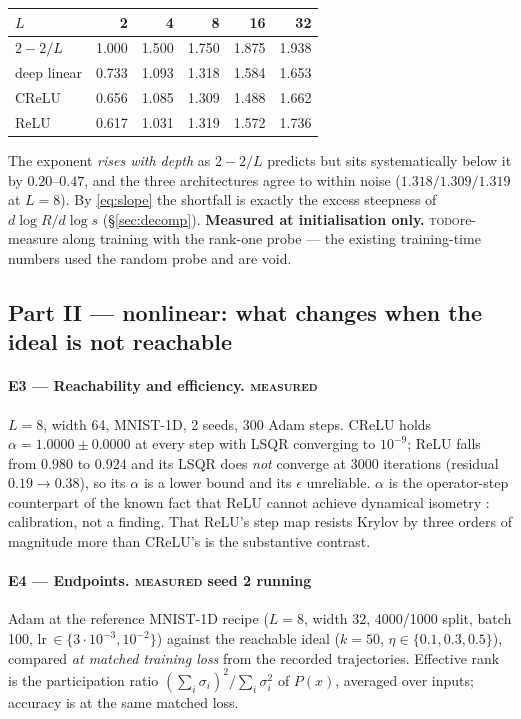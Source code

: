 \documentclass{article}
\newcommand{\RUN}{{\color{blue!70!black}\textsc{measured}}}
\newcommand{\TD}{{\color{orange!85!black}\textsc{todo}}}
\newcommand{\NOTE}[1]{{\color{gray}\small #1}}
\theoremstyle{plain}\newtheorem{theorem}{Theorem}\newtheorem{lemma}[theorem]{Lemma}
\theoremstyle{definition}\newtheorem{definition}[theorem]{Definition}
\begin{document}
\begin{center}\small
\begin{tabular}{lrrrrr}
\toprule
$L$ & 2 & 4 & 8 & 16 & 32 \\
\midrule
$2-2/L$      & 1.000 & 1.500 & 1.750 & 1.875 & 1.938 \\
deep linear  & 0.733 & 1.093 & 1.318 & 1.584 & 1.653 \\
CReLU        & 0.656 & 1.085 & 1.309 & 1.488 & 1.662 \\
ReLU         & 0.617 & 1.031 & 1.319 & 1.572 & 1.736 \\
\bottomrule
\end{tabular}
\end{center}

The exponent \emph{rises with depth} as $2-2/L$ predicts but sits systematically below it by
$0.20$--$0.47$, and the three architectures agree to within noise ($1.318/1.309/1.319$ at $L{=}8$).
By \eqref{eq:slope} the shortfall is exactly the excess steepness of $d\log R/d\log s$
(\S\ref{sec:decomp}). \textbf{Measured at initialisation only.}
\TD{re-measure along training with the rank-one probe --- the existing training-time numbers used
the random probe and are void.}

\subsection*{Part II --- nonlinear: what changes when the ideal is not reachable}

\paragraph{E3 --- Reachability and efficiency. \RUN{}}
$L{=}8$, width 64, MNIST-1D, 2 seeds, 300 Adam steps. CReLU holds $\alpha=1.0000\pm0.0000$ at
every step with LSQR converging to $10^{-9}$; ReLU falls from $0.980$ to $0.924$ and its LSQR does
\emph{not} converge at 3000 iterations (residual $0.19\to0.38$), so its $\alpha$ is a lower bound
and its $\epsilon$ unreliable.
\NOTE{$\alpha$ is the operator-step counterpart of the known fact that ReLU cannot achieve
dynamical isometry \cite{pennington2017resurrecting}: calibration, not a finding. That ReLU's step
map resists Krylov by three orders of magnitude more than CReLU's is the substantive contrast.}

\paragraph{E4 --- Endpoints. \RUN{} seed 2 running}
Adam at the reference MNIST-1D recipe ($L{=}8$, width 32, 4000/1000 split, batch 100,
lr$\,\in\{3\cdot10^{-3},10^{-2}\}$) against the reachable ideal ($k{=}50$,
$\eta\in\{0.1,0.3,0.5\}$), compared \emph{at matched training loss} from the recorded
trajectories. Effective rank is the participation ratio $(\sum_i\sigma_i)^2/\sum_i\sigma_i^2$ of
$P(x)$, averaged over inputs; accuracy is at the same matched loss.
\end{document}
